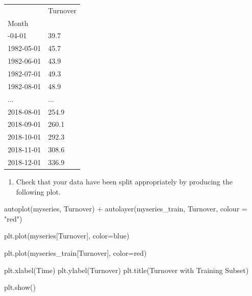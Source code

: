 \documentclass[
  11pt,
]{article}
\newenvironment{Shaded}{\begin{snugshade}}{\end{snugshade}}
\newcommand{\NormalTok}[1]{\textcolor[rgb]{0.00,0.23,0.31}{#1}}
\newcommand{\OperatorTok}[1]{\textcolor[rgb]{0.37,0.37,0.37}{#1}}
\newcommand{\StringTok}[1]{\textcolor[rgb]{0.13,0.47,0.30}{#1}}
\providecommand{\tightlist}{%
  \setlength{\itemsep}{0pt}\setlength{\parskip}{0pt}}\usepackage{longtable,booktabs,array}
\begin{document}
\begin{longtable}[]{@{}ll@{}}
\toprule\noalign{}
& Turnover \\
Month & \\
\midrule\noalign{}
\endhead
\bottomrule\noalign{}
\endlastfoot
1982-04-01 & 39.7 \\
1982-05-01 & 45.7 \\
1982-06-01 & 43.9 \\
1982-07-01 & 49.3 \\
1982-08-01 & 48.9 \\
... & ... \\
2018-08-01 & 254.9 \\
2018-09-01 & 260.1 \\
2018-10-01 & 292.3 \\
2018-11-01 & 308.6 \\
2018-12-01 & 336.9 \\
\end{longtable}

\begin{enumerate}
\def\labelenumi{\alph{enumi}.}
\setcounter{enumi}{1}
\tightlist
\item
  Check that your data have been split appropriately by producing the
  following plot.
\end{enumerate}

\begin{Shaded}
\begin{Highlighting}[]
\NormalTok{autoplot(myseries, Turnover) +}
\NormalTok{  autolayer(myseries\_train, Turnover, colour = "red")}
\end{Highlighting}
\end{Shaded}

\begin{Shaded}
\begin{Highlighting}[]

\NormalTok{plt.plot(myseries[}\StringTok{\textquotesingle{}Turnover\textquotesingle{}}\NormalTok{], color}\OperatorTok{=}\StringTok{\textquotesingle{}blue\textquotesingle{}}\NormalTok{)  }


\NormalTok{plt.plot(myseries\_train[}\StringTok{\textquotesingle{}Turnover\textquotesingle{}}\NormalTok{], color}\OperatorTok{=}\StringTok{\textquotesingle{}red\textquotesingle{}}\NormalTok{)}

\NormalTok{plt.xlabel(}\StringTok{\textquotesingle{}Time\textquotesingle{}}\NormalTok{) }
\NormalTok{plt.ylabel(}\StringTok{\textquotesingle{}Turnover\textquotesingle{}}\NormalTok{)}
\NormalTok{plt.title(}\StringTok{\textquotesingle{}Turnover with Training Subset\textquotesingle{}}\NormalTok{) }

\NormalTok{plt.show()}
\end{Highlighting}
\end{Shaded}
\end{document}
